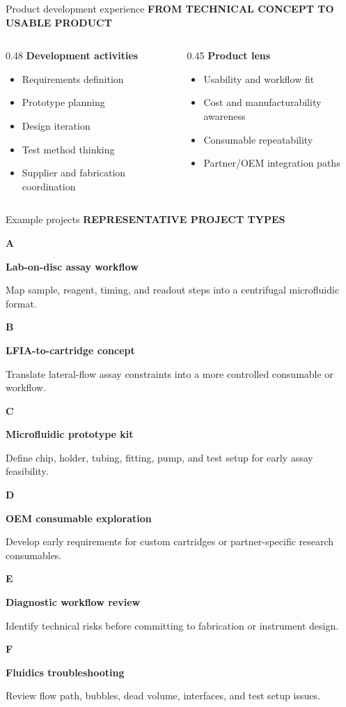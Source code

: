 \documentclass[aspectratio=169]{beamer}
\newcommand{\eyebrow}[1]{{\footnotesize\bfseries\color{MicroCDCoral}\MakeUppercase{#1}}\vspace{0.55em}}
\newcommand{\techcard}[3]{%
  \begin{minipage}[t]{0.31\textwidth}
    \colorbox{MicroCDSoft}{%
      \begin{minipage}[t][0.23\textheight][t]{0.92\linewidth}
        \vspace{0.75em}
        {\footnotesize\bfseries\color{MicroCDGreen}#1}

        \vspace{0.45em}
        {\bfseries #2}

        \vspace{0.3em}
        {\footnotesize\color{MicroCDMuted}#3}
      \end{minipage}
    }
  \end{minipage}
}
\begin{document}
\begin{frame}{Product development experience}
  \eyebrow{From technical concept to usable product}

  \begin{columns}[T]
    \begin{column}{0.48\textwidth}
      {\large\bfseries Development activities}

      \begin{itemize}
        \item Requirements definition
        \item Prototype planning
        \item Design iteration
        \item Test method thinking
        \item Supplier and fabrication coordination
      \end{itemize}
    \end{column}
    \begin{column}{0.45\textwidth}
      {\large\bfseries Product lens}

      \begin{itemize}
        \item Usability and workflow fit
        \item Cost and manufacturability awareness
        \item Consumable repeatability
        \item Partner/OEM integration paths
      \end{itemize}
    \end{column}
  \end{columns}
\end{frame}

\begin{frame}{Example projects}
  \eyebrow{Representative project types}

  \techcard{A}{Lab-on-disc assay workflow}{Map sample, reagent, timing, and readout steps into a centrifugal microfluidic format.}
  \hfill
  \techcard{B}{LFIA-to-cartridge concept}{Translate lateral-flow assay constraints into a more controlled consumable or workflow.}
  \hfill
  \techcard{C}{Microfluidic prototype kit}{Define chip, holder, tubing, fitting, pump, and test setup for early assay feasibility.}

  \vspace{1em}
  \techcard{D}{OEM consumable exploration}{Develop early requirements for custom cartridges or partner-specific research consumables.}
  \hfill
  \techcard{E}{Diagnostic workflow review}{Identify technical risks before committing to fabrication or instrument design.}
  \hfill
  \techcard{F}{Fluidics troubleshooting}{Review flow path, bubbles, dead volume, interfaces, and test setup issues.}
\end{frame}
\end{document}
